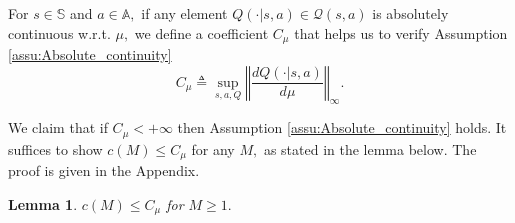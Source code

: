 \documentclass[12pt,technote,onecolumn]{IEEEtran}
\newtheorem{lemma}{Lemma}
\begin{document}
For $s\in\mathbb{S}$ and $a\in\mathbb{A},$ if any element $Q\left(\cdot\vert s,a\right)\in\mathcal{Q}\left(s,a\right)$
is absolutely continuous w.r.t. $\mu,$ we define a coefficient
$C_{\mu}$ that helps us to verify Assumption \ref{assu:Absolute_continuity}
\[
C_{\mu}\triangleq\sup_{s,a,Q}\left\Vert \frac{dQ\left(\cdot|s,a\right)}{d\mu}\right\Vert _{\infty}.
\]

We claim that if $C_{\mu}<+\infty$ then Assumption \ref{assu:Absolute_continuity}
holds. It suffices to show $c\left(M\right)\leq C_{\mu}$ for any
$M,$ as stated in the lemma below. The proof is given in the Appendix.
\begin{lemma}
	\label{lem:C} $c\left(M\right)\leq C_{\mu}$ for $M\geq1.$
\end{lemma}
\end{document}
